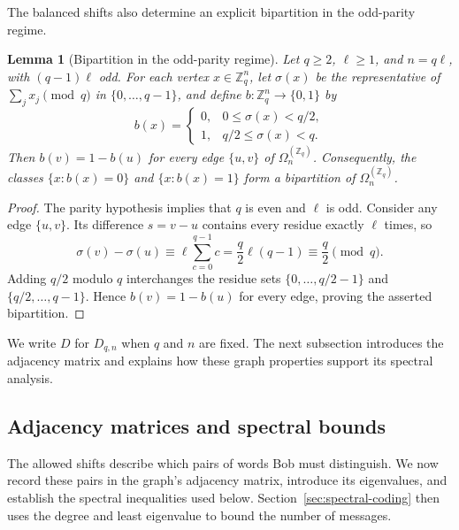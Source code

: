 \documentclass[11pt,a4paper]{article}
\numberwithin{equation}{section}
\numberwithin{figure}{section}
\numberwithin{table}{section}
\numberwithin{footnote}{section}
\newtheorem{lemma}[theorem]{Lemma}
\theoremstyle{informal}\newtheorem*{informaltheorem}{Informal theorem}
\theoremstyle{definition}\newtheorem{example}{Example}[section]
\theoremstyle{remark}\newtheorem{remark}[theorem]{Remark}
\newcommand{\Z}{\mathbb Z}
\newcommand{\Om}{\Omega_n^{(\Z_q)}}
\begin{document}
The balanced shifts also determine an explicit bipartition in the
odd-parity regime.

\begin{lemma}[Bipartition in the odd-parity regime]\label{lem:odd-bipartition}
Let \(q\geq2\), \(\ell\geq1\), and \(n=q\ell\), with
\((q-1)\ell\) odd. For each vertex \(x\in\Z_q^n\), let \(\sigma(x)\) be the
representative of \(\sum_jx_j\pmod q\) in \(\{0,\ldots,q-1\}\), and
define \(b:\Z_q^n\to\{0,1\}\) by
\begin{equation}\label{eq:odd-bipartition}
 b(x)=
 \begin{cases}
  0,&0\leq\sigma(x)<q/2,\\
  1,&q/2\leq\sigma(x)<q.
 \end{cases}
\end{equation}
Then \(b(v)=1-b(u)\) for every edge \(\{u,v\}\) of \(\Om\).
Consequently, the classes \(\{x:b(x)=0\}\) and \(\{x:b(x)=1\}\)
form a bipartition of \(\Om\).
\end{lemma}
\begin{proof}
The parity hypothesis implies that \(q\) is even and \(\ell\) is odd.
Consider any edge \(\{u,v\}\). Its difference
\(s=v-u\) contains every residue exactly \(\ell\) times, so
\begin{equation}
 \sigma(v)-\sigma(u)\equiv\ell\sum_{c=0}^{q-1}c
          =\frac q2\ell(q-1)\equiv\frac q2\pmod q.
\end{equation}
Adding \(q/2\) modulo \(q\) interchanges the residue sets
\(\{0,\ldots,q/2-1\}\) and \(\{q/2,\ldots,q-1\}\).
Hence \(b(v)=1-b(u)\) for every edge, proving the asserted
bipartition.
\end{proof}

We write \(D\) for \(D_{q,n}\) when \(q\) and \(n\) are fixed.
The next subsection introduces the adjacency matrix and explains how
these graph properties support its spectral analysis.

\subsection{Adjacency matrices and spectral bounds}\label{sec:adjacency-spectra}
The allowed shifts describe which pairs of words Bob must distinguish.
We now record these pairs in the graph's adjacency matrix, introduce
its eigenvalues, and establish the spectral inequalities used below.
Section~\ref{sec:spectral-coding} then uses the degree and least
eigenvalue to bound the number of messages.
\end{document}
